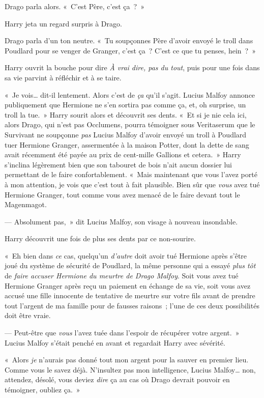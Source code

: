 Drago parla alors. «~C'est Père, c'est ça~?~»

Harry jeta un regard surpris à Drago.

Drago parla d'un ton neutre. «~Tu soupçonnes Père d'avoir envoyé le troll dans Poudlard pour se venger de Granger, c'est ça~? C'est ce que tu penses, hein~?~»

Harry ouvrit la bouche pour dire \emph{À vrai dire, pas du tout}, puis pour une fois dans sa vie parvint à réfléchir et à se taire.

«~Je vois… dit-il lentement. Alors c'est de \emph{ça} qu'il s'agit. Lucius Malfoy annonce publiquement que Hermione ne s'en sortira pas comme ça, et, oh surprise, un troll la tue.~» Harry sourit alors et découvrit ses dents. «~Et si je nie cela ici, alors Drago, qui n'est pas Occlumens, pourra témoigner sous Veritaserum que le Survivant ne soupçonne \emph{pas} Lucius Malfoy d'avoir envoyé un troll à Poudlard tuer Hermione Granger, assermentée à la maison Potter, dont la dette de sang avait récemment été payée au prix de cent-mille Gallions et cetera.~» Harry s'inclina légèrement bien que son tabouret de bois n'ait aucun dossier lui permettant de le faire confortablement. «~Mais maintenant que vous l'avez porté à mon attention, je vois que c'est tout à fait plausible. Bien sûr que \emph{vous} avez tué Hermione Granger, tout comme vous avez menacé de le faire devant tout le Magenmagot.

--- Absolument pas,~» dit Lucius Malfoy, son visage à nouveau insondable.

Harry découvrit une fois de plus ses dents par ce non-sourire.

«~Eh bien dans \emph{ce} cas, quelqu'un \emph{d'autre} doit avoir tué Hermione après s'être joué du système de sécurité de Poudlard, la même personne qui a essayé \emph{plus tôt} de \emph{faire accuser Hermione du meurtre de Drago Malfoy}. Soit vous avez tué Hermione Granger après reçu un paiement en échange de sa vie, soit vous avez accusé une fille innocente de tentative de meurtre sur votre fils avant de prendre tout l'argent de ma famille pour de fausses raisons~; l'une de ces deux possibilités doit être vraie.

--- Peut-être que \emph{vous} l'avez tuée dans l'espoir de récupérer votre argent.~» Lucius Malfoy s'était penché en avant et regardait Harry avec sévérité.

«~Alors \emph{je} n'aurais pas donné tout mon argent pour la sauver en premier lieu. Comme vous le savez déjà. N'insultez pas mon intelligence, Lucius Malfoy… non, attendez, désolé, vous deviez \emph{dire} ça au cas où Drago devrait pouvoir en témoigner, oubliez ça.~»

